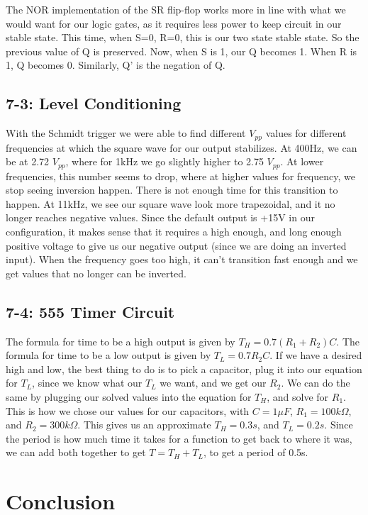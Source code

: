 \documentclass[%
 aip,
 jmp,
 amsmath,
 amssymb,
 reprint,%
 numerical,
 longbibliography,
]{revtex4-1}
\begin{document}
	The NOR implementation of the SR flip-flop works more in line with what we would want
	for our logic gates, as it requires less power to keep circuit in our stable state. This
	time, when S=0, R=0, this is our two state stable state. So the previous value of Q is
	preserved. Now, when S is 1, our Q becomes 1. When R is 1, Q becomes 0. Similarly, Q'
	is the negation of Q.
	
	\subsection{7-3: Level Conditioning}
	
	With the Schmidt trigger we were able to find different $V_{pp}$ values for different frequencies
	at which the square wave for our output stabilizes. At 400Hz, we can be at 2.72 $V_{pp}$, where
	for 1kHz we go slightly higher to 2.75 $V_{pp}$. At lower frequencies, this number seems to drop,
	where at higher values for frequency, we stop seeing inversion happen. There is not enough time for
	this transition to happen. At 11kHz, we see our square wave look more trapezoidal, and it no longer
	reaches negative values. Since the default output is +15V in our configuration, it makes sense that
	it requires a high enough, and long enough positive voltage to give us our negative output (since
	we are doing an inverted input). When the frequency goes too high, it can't transition fast enough
	and we get values that no longer can be inverted.
	
	\subsection{7-4: 555 Timer Circuit}	
	
	The formula for time to be a high output is given by $T_H=0.7(R_1+R_2)C$.
	The formula for time to be a low output is given by $T_L=0.7R_2C$. If we have a desired 
	high and low, the best thing to do is to pick a capacitor, plug it into our equation for 
	$T_L$, since we know what our $T_L$ we want, and we get our $R_2$. We can do the same by
	plugging our solved values into the equation for $T_H$, and solve for $R_1$. This is how
	we chose our values for our capacitors, with $C=1\mu F$, $R_1=100k\Omega$, and 
	$R_2=300k\Omega$. This gives us an approximate $T_H=0.3s$, and $T_L=0.2s$. Since the period
	is how much time it takes for a function to get back to where it was, we can add both together
	to get $T=T_H+T_L$, to get a period of 0.5s.
	
\section{Conclusion}
\end{document}

